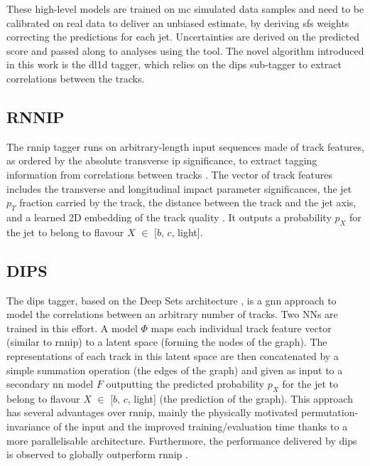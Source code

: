 These high-level models are trained on \gls{mc} simulated data samples and need to be calibrated on real data to deliver an unbiased estimate, by deriving \glspl{sf} weights correcting the predictions for each jet. Uncertainties are derived on the predicted score and passed along to analyses using the tool. The novel algorithm introduced in this work is the \gls{dl1d} tagger, which relies on the \gls{dips} sub-tagger to extract correlations between the tracks.  

\subsection{RNNIP}
The \gls{rnnip} tagger runs on arbitrary-length input sequences made of track features, as ordered by the absolute transverse \gls{ip} significance, to extract tagging information from correlations between tracks \cite{ATL-PHYS-PUB-2017-003}. The vector of track features includes the transverse and longitudinal impact parameter significances, the jet $p_T$ fraction carried by the track, the distance between the track and the jet axis, and a learned 2D embedding of the track quality \cite{Paganini:2289214}. It outputs a probability $p_X$ for the jet to belong to flavour $X$ $\in$ [$b$, $c$, light].

\subsection{DIPS}
The \gls{dips} tagger, based on the Deep Sets architecture \cite{NIPS2017_f22e4747}, is a \gls{gnn} approach to model the correlations between an arbitrary number of tracks. Two NNs are trained in this effort. A model $\Phi$ maps each individual track feature vector (similar to \gls{rnnip}) to a latent space (forming the nodes of the graph). The representations of each track in this latent space are then concatenated by a simple summation operation (the edges of the graph) and given as input to a secondary \gls{nn} model $F$ outputting the predicted probability $p_X$ for the jet to belong to flavour $X$ $\in$ [$b$, $c$, light] (the prediction of the graph). This approach has several advantages over \gls{rnnip}, mainly the physically motivated permutation-invariance of the input and the improved training/evaluation time thanks to a more parallelisable architecture. Furthermore, the performance delivered by \gls{dips} is observed to globally outperform \gls{rnnip} \cite{ATL-PHYS-PUB-2020-014}. 


